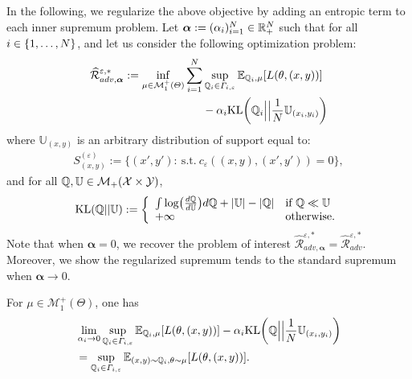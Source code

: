 In the following, we regularize the above objective by adding an entropic term to each inner supremum problem. Let $\bm{\alpha}:=(\alpha_i)_{i=1}^N\in\mathbb{R}_+^N$ such that for all $i\in\{1,\dots,N\}$, and let us consider the following optimization problem:
\begin{equation*}
\begin{aligned}
\label{eq-legendre-KL}
\widehat{\mathcal{R}}_{adv,\bm{\alpha}}^{\varepsilon,*}:=\inf_{\mu\in \mathcal{M}^+_1(\Theta)}\sum_{i=1}^\numsamples&\sup_{\QQ_i\in\Gamma_{i,\varepsilon}}\mathbb{E}_{ \QQ_i, \mu}\left[\loss(\theta,(x,y))\right]\\
&-\alpha_i\text{KL}\left(\QQ_i\Big|\Big|\frac{1}{\numsamples}\mathbb{U}_{(x_i,y_i)}\right)
\end{aligned}
\end{equation*}
where $\mathbb{U}_{(x,y)}$ is an arbitrary distribution of support equal to:
\begin{align*}
    S_{(x,y)}^{(\varepsilon)}:=\Big\{(x',y'):~\text{s.t.}~c_{\varepsilon}((x,y),(x',y'))=0\Big\},
\end{align*}
and for all $\mathbb{Q},\mathbb{U}\in\mathcal{M}_{+}(\mathcal{X}\times\mathcal{Y})$,
\begin{align*}
\text{KL}(\QQ||\mathbb{U}):=  \left\{
    \begin{array}{lll}
        \int\log(\frac{d\QQ}{d\mathbb{U}})d\QQ+|\mathbb{U}| - |\QQ| &  \mbox{if } \QQ\ll \mathbb{U}\\
        +\infty & \mbox{otherwise.}
    \end{array}
\right.
\end{align*}
Note that when $\bm{\alpha}=0$, we recover the problem of interest $\widehat{\mathcal{R}}_{adv,\bm{\alpha}}^{\varepsilon,*}=\widehat{\mathcal{R}}_{adv}^{\varepsilon,*}$. Moreover, we show the regularized supremum tends to the standard supremum when $\bm{\alpha}\to 0$.
\begin{prop}
\label{prop:limit-eps}
For $\mu\in\mathcal{M}_{1}^{+}(\Theta)$, one has
\begin{align*}
    &\lim_{\alpha_i\rightarrow 0}\sup_{\QQ_i\in\Gamma_{i,\varepsilon}}\mathbb{E}_{\QQ_i,\mu}\left[\loss(\theta,(x,y))\right]-\alpha_i\text{KL}\left(\QQ\Big|\Big|\frac{1}{\numsamples}\mathbb{U}_{(x_i,y_i)}\right)\\
    &=\sup_{\QQ_i\in\Gamma_{i,\varepsilon}}\mathbb{E}_{(x,y)\sim \QQ_i,\theta \sim \mu}\left[\loss(\theta,(x,y))\right].
\end{align*}
\end{prop}
